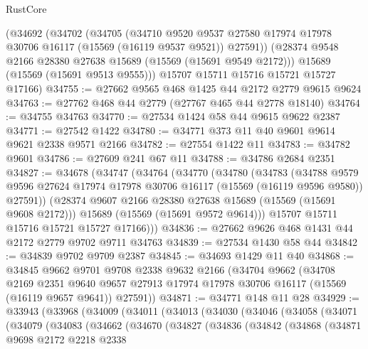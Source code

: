\begin{lexlean}{RustCore}
\begin{coremodule}
    (@34692
      (@34702
        (@34705
          (@34710
            @9520
            @9537
            @27580
            @17974
            @17978
            @30706
            @16117
            (@15569 (@16119 @9537 @9521))
            @27591))
        (@28374 @9548 @2166 @28380 @27638 @15689 (@15569 (@15691 @9549 @2172)))
        @15689
        (@15569 (@15691 @9513 @9555)))
      @15707
      @15711
      @15716
      @15721
      @15727
      @17166)
@34755 := @27662 @9565 @468 @1425 @44 @2172 @2779 @9615 @9624
@34763 := @27762 @468 @44 @2779 (@27767 @465 @44 @2778 @18140)
@34764 := @34755 @34763
@34770 := @27534 @1424 @58 @44 @9615 @9622 @2387
@34771 := @27542 @1422
@34780 := @34771 @373 @11 @40 @9601 @9614 @9621 @2338 @9571 @2166
@34782 := @27554 @1422 @11
@34783 := @34782 @9601
@34786 := @27609 @241 @67 @11
@34788 := @34786 @2684 @2351
@34827 := @34678
    (@34747
      (@34764
        (@34770
          (@34780
            (@34783
              (@34788
                @9579
                @9596
                @27624
                @17974
                @17978
                @30706
                @16117
                (@15569 (@16119 @9596 @9580))
                @27591))
            (@28374 @9607 @2166 @28380 @27638 @15689 (@15569 (@15691 @9608 @2172)))
            @15689
            (@15569 (@15691 @9572 @9614)))
          @15707
          @15711
          @15716
          @15721
          @15727
          @17166)))
@34836 := @27662 @9626 @468 @1431 @44 @2172 @2779 @9702 @9711 @34763
@34839 := @27534 @1430 @58 @44
@34842 := @34839 @9702 @9709 @2387
@34845 := @34693 @1429 @11 @40
@34868 := @34845
    @9662
    @9701
    @9708
    @2338
    @9632
    @2166
    (@34704
      @9662
      (@34708
        @2169
        @2351
        @9640
        @9657
        @27913
        @17974
        @17978
        @30706
        @16117
        (@15569 (@16119 @9657 @9641))
        @27591))
@34871 := @34771 @148 @11 @28
@34929 := @33943
    (@33968
      (@34009
        (@34011
          (@34013
            (@34030
              (@34046
                (@34058
                  (@34071
                    (@34079
                      (@34083
                        (@34662
                          (@34670
                            (@34827
                              (@34836
                                (@34842
                                  (@34868
                                    (@34871
                                      @9698
                                      @2172
                                      @2218
                                      @2338

\end{coremodule}
\end{lexlean}

